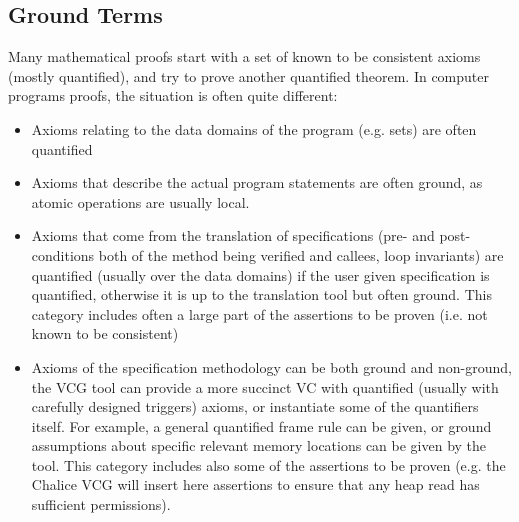 		\subsection{Ground Terms}
	Many mathematical proofs start with a set of known to be consistent axioms (mostly quantified), and try to prove another quantified theorem.
	In computer programs proofs, the situation is often quite different:
	\begin{itemize}
		\item Axioms relating to the data domains of the program (e.g. sets) are often quantified
		\item Axioms that describe the actual program statements are often ground, as atomic operations are usually local.
		\item Axioms that come from the translation of specifications (pre- and post-conditions both of the method being verified and callees, loop invariants) are quantified (usually over the data domains) if the user given specification is quantified, otherwise it is up to the translation tool but often ground.
		This category includes often a large part of the assertions to be proven (i.e. not known to be consistent)
		\item Axioms of the specification methodology can be both ground and non-ground, the VCG tool can provide a more succinct VC with quantified (usually with carefully designed triggers) axioms, or instantiate some of the quantifiers itself.
		For example, a general quantified frame rule can be given, or ground assumptions about specific relevant memory locations can be given by the tool.
		This category includes also some of the assertions to be proven (e.g. the Chalice VCG will insert here assertions to ensure that any heap read has sufficient permissions).
	\end{itemize}
	
